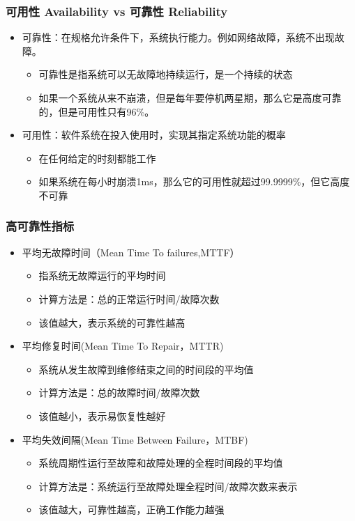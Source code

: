 \begin{frame}[fragile]
    \frametitle{可用性 Availability  vs 可靠性 Reliability}
\begin{itemize}
    \item 可靠性：在规格允许条件下，系统执行能力。例如网络故障，系统不出现故障。
   \begin{itemize}
    \item 可靠性是指系统可以无故障地持续运行，是一个持续的状态
    \item 如果一个系统从来不崩溃，但是每年要停机两星期，那么它是高度可靠的，但是可用性只有96\%。
   \end{itemize}
   \item 可用性：软件系统在投入使用时，实现其指定系统功能的概率
\begin{itemize}
    \item 在任何给定的时刻都能工作
    \item 如果系统在每小时崩溃1ms，那么它的可用性就超过99.9999\%，但它高度不可靠
\end{itemize}
\end{itemize}
\end{frame}


\begin{frame}[fragile]
    \frametitle{高可靠性指标}
\begin{itemize}
    \item 平均无故障时间（Mean Time To failures,MTTF） 
\begin{itemize}
    \item 指系统无故障运行的平均时间
    \item 计算方法是：总的正常运行时间/故障次数
    \item 该值越大，表示系统的可靠性越高
\end{itemize} \pause
    \item 平均修复时间(Mean Time To Repair，MTTR) 
 \begin{itemize}
    \item 系统从发生故障到维修结束之间的时间段的平均值
    \item 计算方法是：总的故障时间/故障次数
    \item 该值越小，表示易恢复性越好
\end{itemize}  \pause
 \item 平均失效间隔(Mean Time Between Failure，MTBF) 
 \begin{itemize}
    \item 系统周期性运行至故障和故障处理的全程时间段的平均值
    \item 计算方法是：系统运行至故障处理全程时间/故障次数来表示
    \item 该值越大，可靠性越高，正确工作能力越强
\end{itemize}  
\end{itemize}
\end{frame}





